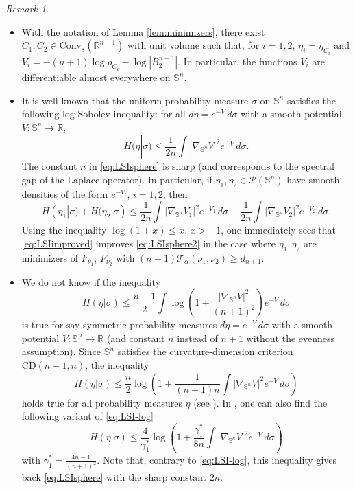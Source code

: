 \documentclass[10pt]{amsart}
\theoremstyle{definition}
\theoremstyle{remark}
\newtheorem{rem}[thm]{Remark}
\newcommand{\R}{\mathbb{R}}
\newcommand{\Sd}{\mathbb{S}}
\begin{document}
\begin{rem}\
\begin{itemize}
\item With the notation of Lemma \ref{lem:minimizers}, there exist $C_1,C_2 \in \mathrm{Conv}_s(\R^{n+1})$ with unit volume such that, for $i=1,2$, $\eta_i = \eta_{C_i}$ and $V_i = -(n+1)\log \rho_{C_i} - \log |B_2^{n+1}|$. In particular, the functions $V_i$ are differentiable almost everywhere on $\Sd^n$.
\item It is well known that the uniform probability measure $\sigma$ on $\Sd^n$ satisfies the following log-Sobolev inequality: for all $d\eta = e^{-V}\,d\sigma$ with a smooth potential $V:\Sd^n \to \R$, 
\begin{equation}\label{eq:LSIsphere}
H(\eta | \sigma)\leq \frac{1}{2n}\int |\nabla_{\Sd^n}V|^2e^{-V}\,d\sigma.
\end{equation}
The constant $n$ in \eqref{eq:LSIsphere} is sharp (and corresponds to the spectral gap of the Laplace operator). 
In particular, if $\eta_1,\eta_2 \in \mathcal{P}(\Sd^n)$ have smooth densities of the form $e^{-V_i}$, $i=1,2$, then 
\begin{equation}\label{eq:LSIsphere2}
H(\eta_1 | \sigma)+H(\eta_2 | \sigma)\leq \frac{1}{2n}\int |\nabla_{\Sd^n}V_1|^2e^{-V_1}\,d\sigma+\frac{1}{2n}\int |\nabla_{\Sd^n}V_2|^2e^{-V_2}\,d\sigma.
\end{equation}
Using the inequality $\log(1+x) \leq x$, $x>-1$, one immediately sees that \eqref{eq:LSIimproved} improves \eqref{eq:LSIsphere2} in the case where $\eta_1,\eta_2$ are minimizers of $F_{\nu_1}$, $F_{\nu_2}$ with $(n+1)\mathcal{T}_\alpha(\nu_1,\nu_2) \geq d_{n+1}$. 
\item We do not know if the inequality 
\[
H(\eta | \sigma)\leq \frac{n+1}{2}\int \log\left(1+ \frac{|\nabla_{\Sd^n}V|^2}{(n+1)^2} \right)e^{-V}\,d\sigma
\]
is true for say symmetric probability measures $d\eta = e^{-V}\,d\sigma$ with a smooth potential $V:\Sd^n \to \R$ (and constant $n$ instead of $n+1$ without the evenness assumption). 
Since $\Sd^n$ satisfies the curvature-dimension criterion $\mathrm{CD}(n-1,n)$, the inequality 
\begin{equation}\label{eq:LSI-log}
H(\eta | \sigma)\leq \frac{n}{2}\log\left( 1+\frac{1}{(n-1)n}\int |\nabla_{\Sd^n}V|^2 e^{-V}\,d\sigma\right)
\end{equation}
holds true for all probability measures $\eta$ (see \cite{BGL}). 
In \cite[Theorem1.1]{DEKL}, one can also find the following variant of \eqref{eq:LSI-log}
\[
H(\eta | \sigma)\leq \frac{4}{\gamma_1^*}\log\left( 1+\frac{\gamma_1^*}{8 n}\int  |\nabla_{\Sd^n}V|^2e^{-V}\,d\sigma\right)
\]
with $\gamma_1^* = \frac{4n-1}{(n+1)^2}$. Note that, contrary to \eqref{eq:LSI-log}, this inequality gives back \eqref{eq:LSIsphere} with the sharp constant $2n.$
\end{itemize}
\end{rem}
\end{document}
